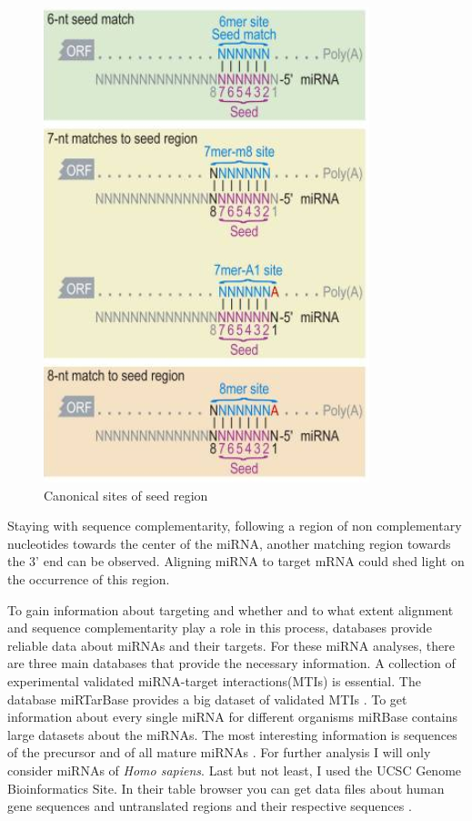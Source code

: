 \documentclass[12pt]{article}
\begin{document}
\begin{figure}[h]
\centering
\includegraphics[scale=0.6]{results/canonical_sites.png}
\caption{Canonical sites of seed region}
\label{Fig:canonical}
\end{figure}

Staying with sequence complementarity, following a region of non complementary nucleotides towards the center of the miRNA, another matching region towards the 3' end can be observed. Aligning miRNA to target mRNA could shed light on the occurrence of this region. 

To gain information about targeting and whether and to what extent alignment and sequence complementarity play a role in this process, databases provide reliable data about miRNAs and their targets. 
For these miRNA analyses, there are three main databases that provide the necessary information. A collection of experimental validated miRNA-target interactions(MTIs) is essential. The database miRTarBase provides a big dataset of validated MTIs \cite{Hsu}. To get information about every single miRNA for different organisms miRBase contains large datasets about the miRNAs. The most interesting information is sequences of the precursor and of all mature miRNAs \cite{mirbase}. For further analysis I will only consider miRNAs of \textit{Homo sapiens}. Last but not least, I used the UCSC Genome Bioinformatics Site. In their table browser you can get data files about human gene sequences and untranslated regions and their respective sequences \cite{ucsc}.
  
\end{document}
